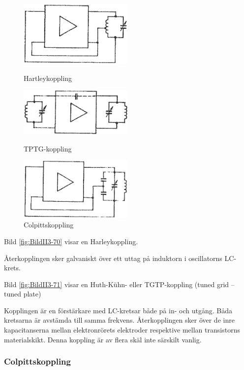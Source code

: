 \begin{figure}
  \includegraphics[width=0.5\textwidth]{images/cropped_pdfs/bild_2_3-70.pdf}
  \caption{Hartleykoppling}
  \label{fig:BildII3-70}

  \includegraphics[width=0.5\textwidth]{images/cropped_pdfs/bild_2_3-71.pdf}
  \caption{TPTG-koppling}
  \label{fig:BildII3-71}

  \includegraphics[width=0.5\textwidth]{images/cropped_pdfs/bild_2_3-72.pdf}
  \caption{Colpittskoppling}
  \label{fig:BildII3-72}
\end{figure}

Bild \ref{fig:BildII3-70} visar en Harleykoppling.

Återkopplingen sker galvaniskt över ett uttag på induktorn i oscillatorns
LC-krets.

Bild \ref{fig:BildII3-71} visar en Huth-Kühn- eller TGTP-koppling
(tuned grid -- tuned plate)

Kopplingen är en förstärkare med LC-kretsar både på in- och utgång.
Båda kretsarna är avstämda till samma frekvens.
Återkopplingen sker över de inre kapacitanserna mellan elektronrörets elektroder
respektive mellan transistorns materialskikt.
Denna koppling är av flera skäl inte särskilt vanlig.

\subsubsection{Colpittskoppling}

